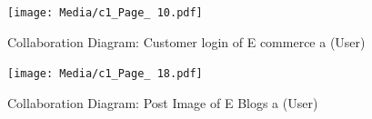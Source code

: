 \documentclass[12pt]{report}
\begin{document}
\begin{figure}[ht]
    \centering
    \texttt{[image: Media/c1\_Page\_ 10.pdf]} %
    \caption{Collaboration Diagram: Customer login of E commerce a (User)}
    \label{fig:drawing1}
\end{figure}








\begin{figure}[ht]
    \centering
    \texttt{[image: Media/c1\_Page\_ 18.pdf]} %
    \caption{Collaboration Diagram: Post Image of E Blogs a (User)}
    \label{fig:drawing1}
\end{figure}
\end{document}

